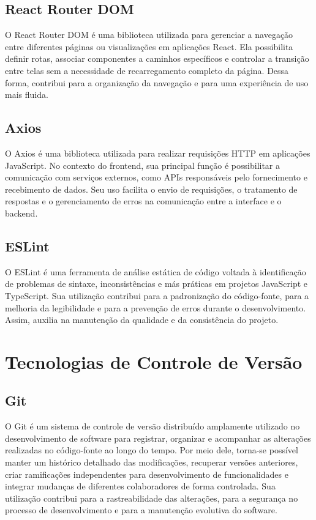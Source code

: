 \documentclass[grad,pdftex]{poli}
\begin{document}
\subsection{React Router DOM}

O React Router DOM é uma biblioteca utilizada para gerenciar a navegação entre diferentes páginas ou visualizações em aplicações React. Ela possibilita definir rotas, associar componentes a caminhos específicos e controlar a transição entre telas sem a necessidade de recarregamento completo da página. Dessa forma, contribui para a organização da navegação e para uma experiência de uso mais fluida.

\subsection{Axios}

O Axios é uma biblioteca utilizada para realizar requisições HTTP em aplicações JavaScript. No contexto do frontend, sua principal função é possibilitar a comunicação com serviços externos, como APIs responsáveis pelo fornecimento e recebimento de dados. Seu uso facilita o envio de requisições, o tratamento de respostas e o gerenciamento de erros na comunicação entre a interface e o backend.

\subsection{ESLint}

O ESLint é uma ferramenta de análise estática de código voltada à identificação de problemas de sintaxe, inconsistências e más práticas em projetos JavaScript e TypeScript. Sua utilização contribui para a padronização do código-fonte, para a melhoria da legibilidade e para a prevenção de erros durante o desenvolvimento. Assim, auxilia na manutenção da qualidade e da consistência do projeto.

\section{Tecnologias de Controle de Versão}


\subsection{Git}

O Git é um sistema de controle de versão distribuído amplamente utilizado no desenvolvimento de software para registrar, organizar e acompanhar as alterações realizadas no código-fonte ao longo do tempo. Por meio dele, torna-se possível manter um histórico detalhado das modificações, recuperar versões anteriores, criar ramificações independentes para desenvolvimento de funcionalidades e integrar mudanças de diferentes colaboradores de forma controlada. Sua utilização contribui para a rastreabilidade das alterações, para a segurança no processo de desenvolvimento e para a manutenção evolutiva do software.
\end{document}
